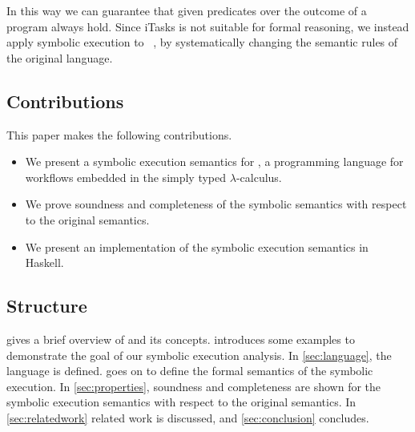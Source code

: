 In this way we can guarantee that given predicates over the outcome of a \TOP program always hold.
Since iTasks is not suitable for formal reasoning, we instead apply symbolic execution to \TOPHAT~\cite{DBLP:conf/ppdp/SteenvoordenNK19}, by systematically changing the semantic rules of the original language.



\subsection{Contributions}

This paper makes the following contributions.

\begin{itemize}
  \item We present a symbolic execution semantics for \TOPHAT, a programming language for workflows embedded in the simply typed $\lambda$-calculus.
  \item We prove soundness and completeness of the symbolic semantics with respect to the original \TOPHAT semantics.
  \item We present an implementation of the symbolic execution semantics in Haskell.
\end{itemize}



\subsection{Structure}

 gives a brief overview of \TOPHAT and its concepts.
 introduces some examples to demonstrate the goal of our symbolic execution analysis.
In \cref{sec:language}, the \TOPHAT language is defined.
 goes on to define the formal semantics of the symbolic execution.
In \cref{sec:properties}, soundness and completeness are shown for the symbolic execution semantics with respect to the original \TOPHAT semantics.
In \cref{sec:relatedwork} related work is discussed, and \cref{sec:conclusion} concludes.
